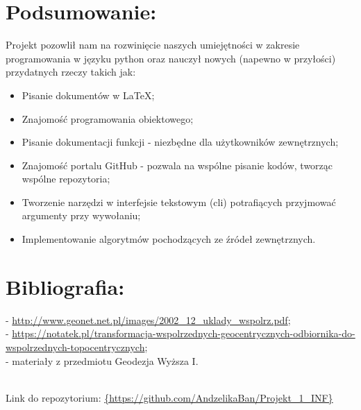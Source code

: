 \documentclass[a4paper]{article}
\begin{document}
\section{Podsumowanie:}
Projekt pozowlił nam na rozwinięcie naszych umiejętności w zakresie programowania w języku python oraz nauczył nowych (napewno w przyłości) przydatnych rzeczy takich jak: \\
\begin{itemize}
	\item Pisanie dokumentów w LaTeX;
	\item Znajomość programowania obiektowego;
	\item Pisanie dokumentacji funkcji - niezbędne dla użytkowników zewnętrznych;
	\item Znajomość portalu GitHub - pozwala na wspólne pisanie kodów, tworząc wspólne repozytoria;
	\item Tworzenie narzędzi w interfejsie tekstowym (cli) potrafiących przyjmować argumenty przy wywołaniu;
	\item Implementowanie algorytmów pochodzących ze źródeł zewnętrznych.
	\end{itemize}

\section{Bibliografia:}
 - \url{http://www.geonet.net.pl/images/2002_12_uklady_wspolrz.pdf}; \\
 - \url{https://notatek.pl/transformacja-wspolrzednych-geocentrycznych-odbiornika-do-wspolrzednych-topocentrycznych}; \\
 - materiały z przedmiotu Geodezja Wyższa I. \\
 \\
\begin{center}
 	\Large{Link do repozytorium: \url{{https://github.com/AndzelikaBan/Projekt_1_INF}}} 
\end{center}
\end{document}
